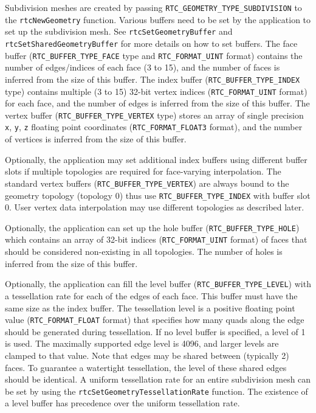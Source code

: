 Subdivision meshes are created by passing
\texttt{RTC\_GEOMETRY\_TYPE\_SUBDIVISION} to the \texttt{rtcNewGeometry}
function. Various buffers need to be set by the application to set up
the subdivision mesh. See \texttt{rtcSetGeometryBuffer} and
\texttt{rtcSetSharedGeometryBuffer} for more details on how to set
buffers. The face buffer (\texttt{RTC\_BUFFER\_TYPE\_FACE} type and
\texttt{RTC\_FORMAT\_UINT} format) contains the number of edges/indices
of each face (3 to 15), and the number of faces is inferred from the
size of this buffer. The index buffer (\texttt{RTC\_BUFFER\_TYPE\_INDEX}
type) contains multiple (3 to 15) 32-bit vertex indices
(\texttt{RTC\_FORMAT\_UINT} format) for each face, and the number of
edges is inferred from the size of this buffer. The vertex buffer
(\texttt{RTC\_BUFFER\_TYPE\_VERTEX} type) stores an array of single
precision \texttt{x}, \texttt{y}, \texttt{z} floating point coordinates
(\texttt{RTC\_FORMAT\_FLOAT3} format), and the number of vertices is
inferred from the size of this buffer.

Optionally, the application may set additional index buffers using
different buffer slots if multiple topologies are required for
face-varying interpolation. The standard vertex buffers
(\texttt{RTC\_BUFFER\_TYPE\_VERTEX}) are always bound to the geometry
topology (topology 0) thus use \texttt{RTC\_BUFFER\_TYPE\_INDEX} with
buffer slot 0. User vertex data interpolation may use different
topologies as described later.

Optionally, the application can set up the hole buffer
(\texttt{RTC\_BUFFER\_TYPE\_HOLE}) which contains an array of 32-bit
indices (\texttt{RTC\_FORMAT\_UINT} format) of faces that should be
considered non-existing in all topologies. The number of holes is
inferred from the size of this buffer.

Optionally, the application can fill the level buffer
(\texttt{RTC\_BUFFER\_TYPE\_LEVEL}) with a tessellation rate for each of
the edges of each face. This buffer must have the same size as the index
buffer. The tessellation level is a positive floating point value
(\texttt{RTC\_FORMAT\_FLOAT} format) that specifies how many quads along
the edge should be generated during tessellation. If no level buffer is
specified, a level of 1 is used. The maximally supported edge level is
4096, and larger levels are clamped to that value. Note that edges may
be shared between (typically 2) faces. To guarantee a watertight
tessellation, the level of these shared edges should be identical. A
uniform tessellation rate for an entire subdivision mesh can be set by
using the \texttt{rtcSetGeometryTessellationRate} function. The
existence of a level buffer has precedence over the uniform tessellation
rate.

